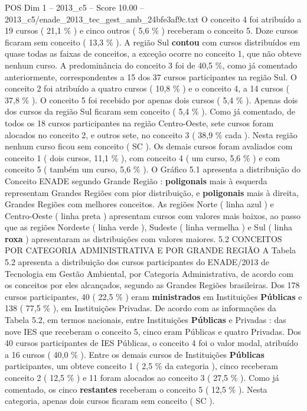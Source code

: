 \begin{textsample}{POS Dim 1 – 2013\_c5 – Score 10.00 – 2013\_c5/enade\_2013\_tec\_gest\_amb\_24bfe3af9c.txt}
O conceito 4 foi atribuído a 19 cursos ( 21,1 \% ) e cinco outros ( 5,6 \% ) receberam o conceito 5.
Doze cursos ficaram sem conceito ( 13,3 \% ).
A região Sul \textbf{contou} com cursos distribuídos em quase todas as faixas de conceitos, a exceção ocorre no conceito 1, que não obteve nenhum curso.
A predominância do conceito 3 foi de 40,5 \%, como já comentado anteriormente, correspondentes a 15 dos 37 cursos participantes na região Sul.
O conceito 2 foi atribuído a quatro cursos ( 10,8 \% ) e o conceito 4, a 14 cursos ( 37,8 \% ).
O conceito 5 foi recebido por apenas dois cursos ( 5,4 \% ).
Apenas dois dos cursos da região Sul ficaram sem conceito ( 5,4 \% ).
Como já comentado, de todos os 18 cursos participantes na região Centro-Oeste, sete cursos foram alocados no conceito 2, e outros sete, no conceito 3 ( 38,9 \% cada ).
Nesta região nenhum curso ficou sem conceito ( SC ).
Os demais cursos foram avaliados com conceito 1 ( dois cursos, 11,1 \% ), com conceito 4 ( um curso, 5,6 \% ) e com conceito 5 ( também um curso, 5,6 \% ).
O Gráfico 5.1 apresenta a distribuição do Conceito ENADE segundo Grande Região : \textbf{poligonais} mais à esquerda representam Grandes Regiões com pior distribuição, e \textbf{poligonais} mais à direita, Grandes Regiões com melhores conceitos.
As regiões Norte ( linha azul ) e Centro-Oeste ( linha preta ) apresentam cursos com valores mais baixos, ao passo que as regiões Nordeste ( linha verde ), Sudeste ( linha vermelha ) e Sul ( linha \textbf{roxa} ) apresentaram as distribuições com valores maiores. 5.2 CONCEITOS POR CATEGORIA ADMINISTRATIVA E POR GRANDE REGIÃO A Tabela 5.2 apresenta a distribuição dos cursos participantes do ENADE/2013 de Tecnologia em Gestão Ambiental, por Categoria Administrativa, de acordo com os conceitos por eles alcançados, segundo as Grandes Regiões brasileiras.
Dos 178 cursos participantes, 40 ( 22,5 \% ) eram \textbf{ministrados} em Instituições \textbf{Públicas} e 138 ( 77,5 \% ), em Instituições Privadas.
De acordo com as informações da Tabela 5.2, em termos nacionais, entre Instituições \textbf{Públicas} e Privadas : das nove IES que receberam o conceito 5, cinco eram Públicas e quatro Privadas.
Dos 40 cursos participantes de IES Públicas, o conceito 4 foi o valor modal, atribuído a 16 cursos ( 40,0 \% ).
Entre os demais cursos de Instituições \textbf{Públicas} participantes, um obteve conceito 1 ( 2,5 \% da categoria ), cinco receberam conceito 2 ( 12,5 \% ) e 11 foram alocados ao conceito 3 ( 27,5 \% ).
Como já comentado, os cinco \textbf{restantes} receberam o conceito 5 ( 12,5 \% ).
Nesta categoria, apenas dois cursos ficaram sem conceito ( SC ).

\end{textsample}
